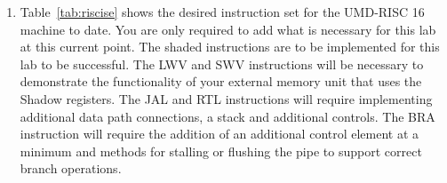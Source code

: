 \documentclass{article}
\begin{document}
\begin{enumerate}

\item Table~\ref{tab:riscise} shows the desired instruction set for the UMD-RISC 16 machine to date. You are only required to add what is necessary for this lab at this current point. The shaded instructions are to be implemented for this lab to be successful. The LWV and SWV instructions will be necessary to demonstrate the functionality of your external memory unit that uses the Shadow registers. The JAL and RTL instructions will require implementing additional data path connections, a stack and additional controls. The BRA instruction will require the addition of an additional control element at a minimum and methods for stalling or flushing the pipe to support correct branch operations.


\end{enumerate}
\end{document}
